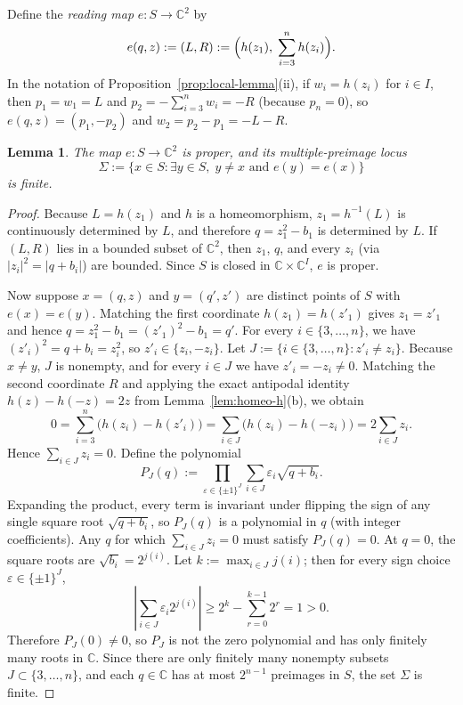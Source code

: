 \documentclass[11pt,a4paper]{amsart}
\numberwithin{equation}{section}
\newtheorem{lemma}[theorem]{Lemma}
\theoremstyle{definition}
\newcommand{\C}{\mathbb{C}}
\begin{document}
Define the \emph{reading map} $e : S \to \C^2$ by
\[
e(q, z) := (L, R) := \Bigl(h(z_1),\; \sum_{i=3}^n h(z_i)\Bigr).
\]
In the notation of Proposition~\ref{prop:local-lemma}(ii), if $w_i = h(z_i)$ for $i \in I$, then $p_1 = w_1 = L$ and $p_2 = -\sum_{i=3}^n w_i = -R$ (because $p_n = 0$), so $e(q,z) = (p_1, -p_2)$ and $w_2 = p_2 - p_1 = -L - R$.

\begin{lemma}
\label{lem:e-proper-finite}
The map $e : S \to \C^2$ is proper, and its multiple-preimage locus
\[
\Sigma := \{x \in S : \exists y \in S,\; y \ne x \text{ and } e(y) = e(x)\}
\]
is finite.
\end{lemma}

\begin{proof}
Because $L = h(z_1)$ and $h$ is a homeomorphism, $z_1 = h^{-1}(L)$ is continuously determined by $L$, and therefore $q = z_1^2 - b_1$ is determined by $L$. If $(L, R)$ lies in a bounded subset of $\C^2$, then $z_1$, $q$, and every $z_i$ (via $|z_i|^2 = |q + b_i|$) are bounded. Since $S$ is closed in $\C \times \C^I$, $e$ is proper.

Now suppose $x = (q, z)$ and $y = (q', z')$ are distinct points of $S$ with $e(x) = e(y)$. Matching the first coordinate $h(z_1) = h(z'_1)$ gives $z_1 = z'_1$ and hence $q = z_1^2 - b_1 = (z'_1)^2 - b_1 = q'$. For every $i \in \{3, \dots, n\}$, we have $(z'_i)^2 = q + b_i = z_i^2$, so $z'_i \in \{z_i, -z_i\}$. Let $J := \{i \in \{3, \dots, n\} : z'_i \ne z_i\}$. Because $x \ne y$, $J$ is nonempty, and for every $i \in J$ we have $z'_i = -z_i \ne 0$. Matching the second coordinate $R$ and applying the exact antipodal identity $h(z) - h(-z) = 2z$ from Lemma~\ref{lem:homeo-h}(b), we obtain
\[
0 = \sum_{i=3}^n \bigl(h(z_i) - h(z'_i)\bigr) = \sum_{i \in J} \bigl(h(z_i) - h(-z_i)\bigr) = 2 \sum_{i \in J} z_i.
\]
Hence $\sum_{i \in J} z_i = 0$. Define the polynomial
\[
P_J(q) := \prod_{\varepsilon \in \{\pm 1\}^J} \sum_{i \in J} \varepsilon_i \sqrt{q + b_i}.
\]
Expanding the product, every term is invariant under flipping the sign of any single square root $\sqrt{q + b_i}$, so $P_J(q)$ is a polynomial in $q$ (with integer coefficients). Any $q$ for which $\sum_{i \in J} z_i = 0$ must satisfy $P_J(q) = 0$. At $q = 0$, the square roots are $\sqrt{b_i} = 2^{j(i)}$. Let $k := \max_{i \in J} j(i)$; then for every sign choice $\varepsilon \in \{\pm 1\}^J$,
\[
\left|\sum_{i \in J} \varepsilon_i 2^{j(i)}\right| \ge 2^k - \sum_{r=0}^{k-1} 2^r = 1 > 0.
\]
Therefore $P_J(0) \ne 0$, so $P_J$ is not the zero polynomial and has only finitely many roots in $\C$. Since there are only finitely many nonempty subsets $J \subset \{3,\dots,n\}$, and each $q \in \C$ has at most $2^{n-1}$ preimages in $S$, the set $\Sigma$ is finite.
\end{proof}
\end{document}
